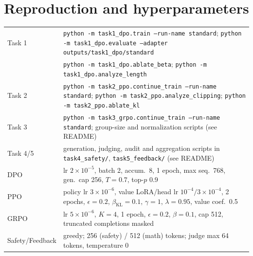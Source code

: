 \documentclass{article}
\begin{document}
\section{Reproduction and hyperparameters}
\begin{footnotesize}
\begin{tabular}{@{}lp{4.75in}@{}}
\toprule
Task 1 & \texttt{python -m task1\_dpo.train --run-name standard}; \texttt{python -m task1\_dpo.evaluate --adapter outputs/task1\_dpo/standard}\\
& \texttt{python -m task1\_dpo.ablate\_beta}; \texttt{python -m task1\_dpo.analyze\_length}\\
Task 2 & \texttt{python -m task2\_ppo.continue\_train --run-name standard}; \texttt{python -m task2\_ppo.analyze\_clipping}; \texttt{python -m task2\_ppo.ablate\_kl}\\
Task 3 & \texttt{python -m task3\_grpo.continue\_train --run-name standard}; group-size and normalization scripts (see README)\\
Task 4/5 & generation, judging, audit and aggregation scripts in \texttt{task4\_safety/}, \texttt{task5\_feedback/} (see README)\\
\midrule
DPO & lr $2{\times}10^{-5}$, batch 2, accum.\ 8, 1 epoch, max seq.\ 768, gen.\ cap 256, $T{=}0.7$, top-$p$ 0.9\\
PPO & policy lr $3{\times}10^{-6}$, value LoRA/head lr $10^{-4}/3{\times}10^{-4}$, 2 epochs, $\epsilon{=}0.2$, $\beta_{\text{KL}}{=}0.1$, $\gamma{=}1$, $\lambda{=}0.95$, value coef.\ 0.5\\
GRPO & lr $5{\times}10^{-6}$, $K{=}4$, 1 epoch, $\epsilon{=}0.2$, $\beta{=}0.1$, cap 512, truncated completions masked\\
Safety/Feedback & greedy; 256 (safety) / 512 (math) tokens; judge max 64 tokens, temperature 0\\
\bottomrule
\end{tabular}
\end{footnotesize}
\end{document}
